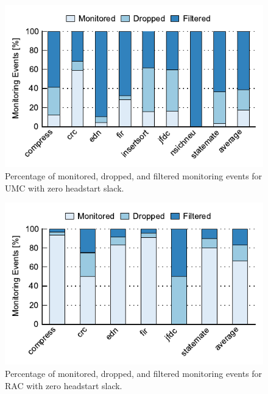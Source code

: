 \begin{figure}
  \begin{center}
    \includegraphics{monitoring_hard_drop/data/zero_slack_umc.pdf}
    \caption{Percentage of monitored, dropped, and filtered monitoring events
    for UMC with zero headstart slack.}
    \label{fig:monitoring_hard_drop.evaluation.zero_slack_umc}
  \end{center}
\end{figure}
\begin{figure}
  \begin{center}
    \includegraphics{monitoring_hard_drop/data/zero_slack_lrc.pdf}
    \caption{Percentage of monitored, dropped, and filtered monitoring events
    for RAC with zero headstart slack.}
    \label{fig:monitoring_hard_drop.evaluation.zero_slack_lrc}
  \end{center}
\end{figure}
